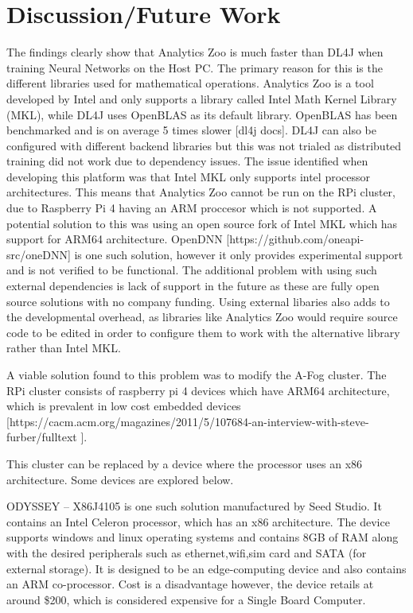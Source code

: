 %

\section{Discussion/Future Work}

The findings clearly show that Analytics Zoo is much faster than DL4J when training Neural Networks on the Host PC. The primary reason for this is the different libraries used for mathematical operations. Analytics Zoo is a tool developed by Intel and only supports a library called Intel Math Kernel Library (MKL), while DL4J uses OpenBLAS as its default library. OpenBLAS has been benchmarked and is on average 5 times slower [dl4j docs]. DL4J can also be configured with different backend libraries but this was not trialed as distributed training did not work due to dependency issues. The issue identified when developing this platform was that Intel MKL only supports intel processor architectures. This means that Analytics Zoo cannot be run on the RPi cluster, due to Raspberry Pi 4 having an ARM proccesor which is not supported.  A potential solution to this was using an open source fork of Intel MKL which has support for ARM64 architecture. OpenDNN [https://github.com/oneapi-src/oneDNN] is one such solution, however it only provides experimental support and is not verified to be functional. The additional problem with using such external dependencies is lack of support in the future as these are fully open source solutions with no company funding. Using external libaries also adds to the developmental overhead, as libraries like Analytics Zoo would require source code to be edited in order to configure them to work with the alternative library rather than Intel MKL.   

A viable solution found to this problem was to modify the A-Fog cluster. The RPi cluster consists of raspberry pi 4 devices which have ARM64 architecture, which is prevalent in low cost embedded devices [https://cacm.acm.org/magazines/2011/5/107684-an-interview-with-steve-furber/fulltext ].  

This cluster can be replaced by a device where the processor uses an x86 architecture. Some devices are explored below. 

 

 ODYSSEY – X86J4105 is one such solution manufactured by Seed Studio. It contains an Intel Celeron processor, which has an x86 architecture. The device supports windows and linux operating systems and contains 8GB of RAM along with the desired peripherals such as ethernet,wifi,sim card and SATA (for external storage).  It is designed to be an edge-computing device and also contains an ARM co-processor. Cost is a disadvantage however, the device retails at around \$200, which is considered expensive for a Single Board Computer. 

